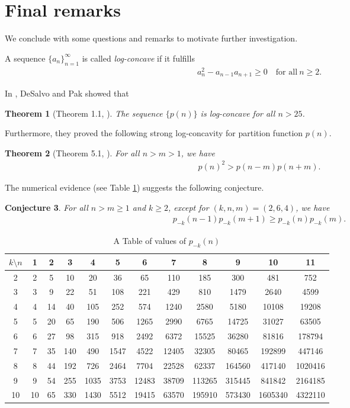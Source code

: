 \documentclass[12pt,reqno]{amsart}
\numberwithin{equation}{section}
\theoremstyle{plain}
\newtheorem{theorem}{Theorem}[section]
\newtheorem{conjecture}[theorem]{Conjecture}
\theoremstyle{definition}
\begin{document}
\section{Final remarks}
We conclude with some questions and remarks to motivate further investigation.

A sequence $\{a_{n}\}_{n=1}^{\infty}$ is called \emph{log-concave} if it fulfills
\begin{align*}
a_{n}^{2}-a_{n-1}a_{n+1}\geq0\quad \textrm{for~all}~n\ge 2.
\end{align*}

In \cite{DP2015}, DeSalvo and Pak showed that
\begin{theorem}[Theorem 1.1, \cite{DP2015}]
The sequence $\{p(n)\}$ is log-concave for all $n>25$.
\end{theorem}
Furthermore, they proved the following strong log-concavity for partition function $p(n)$.
\begin{theorem}[Theorem 5.1, \cite{DP2015}]
For all $n>m>1$, we have
\begin{align*}
p(n)^{2}>p(n-m)p(n+m).
\end{align*}
\end{theorem}
The numerical evidence (see Table \ref{Tab2}) suggests the following conjecture.

\begin{conjecture}
For all $n>m\geq 1$ and $k\geq2$, except for $(k,n,m)=(2,6,4)$, we have
\begin{align*}
p_{-k}(n-1)p_{-k}(m+1)\geq p_{-k}(n)p_{-k}(m).
\end{align*}
\end{conjecture}
\begin{table}[tbp]\caption{A Table of values of $p_{-k}(n)$}\label{Tab2}
\centering
\begin{tabular}{||c|ccccccccccc||}
\hline
$k\setminus n$ &1 &2 &3 &4 &5 &6 &7 &8 &9 &10 &11\\
\hline
2 &2 &5 &10 &20 &36 &65 &110 &185 &300 &481 &752\\
3 &3 &9 &22 &51 &108 &221 &429 &810 &1479 &2640 &4599\\
4 &4 &14 &40 &105 &252 &574 &1240 &2580 &5180 &10108 &19208\\
5 &5 &20 &65 &190 &506 &1265 &2990 &6765 &14725 &31027 &63505\\
6 &6 &27 &98 &315 &918 &2492 &6372 &15525 &36280 &81816 &178794\\
7 &7 &35 &140 &490 &1547 &4522 &12405 &32305 &80465 &192899 &447146\\
8 &8 &44 &192 &726 &2464 &7704 &22528 &62337 &164560 &417140 &1020416\\
9 &9 &54 &255 &1035 &3753 &12483 &38709 &113265 &315445 &841842 &2164185\\
10 &10 &65 &330 &1430 &5512 &19415 &63570 &195910 &573430 &1605340 &4322110\\
\hline
\end{tabular}
\end{table}
\end{document}
